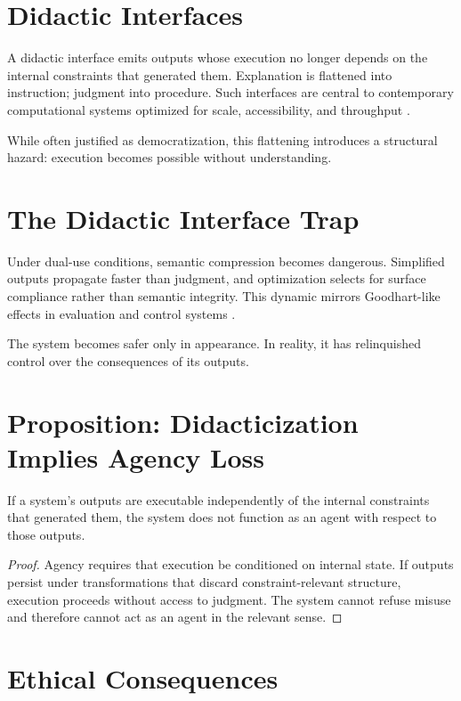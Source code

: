 \documentclass[12pt]{article}
\begin{document}
\section{Didactic Interfaces}

A didactic interface emits outputs whose execution no longer depends on the internal constraints that generated them. Explanation is flattened into instruction; judgment into procedure. Such interfaces are central to contemporary computational systems optimized for scale, accessibility, and throughput \cite{norman}.

While often justified as democratization, this flattening introduces a structural hazard: execution becomes possible without understanding.

\section{The Didactic Interface Trap}

Under dual-use conditions, semantic compression becomes dangerous. Simplified outputs propagate faster than judgment, and optimization selects for surface compliance rather than semantic integrity. This dynamic mirrors Goodhart-like effects in evaluation and control systems \cite{manheim, russell}.

The system becomes safer only in appearance. In reality, it has relinquished control over the consequences of its outputs.

\section{Proposition: Didacticization Implies Agency Loss}

\begin{proposition}
If a system’s outputs are executable independently of the internal constraints that generated them, the system does not function as an agent with respect to those outputs.
\end{proposition}

\begin{proof}
Agency requires that execution be conditioned on internal state. If outputs persist under transformations that discard constraint-relevant structure, execution proceeds without access to judgment. The system cannot refuse misuse and therefore cannot act as an agent in the relevant sense.
\end{proof}

\section{Ethical Consequences}
\end{document}
